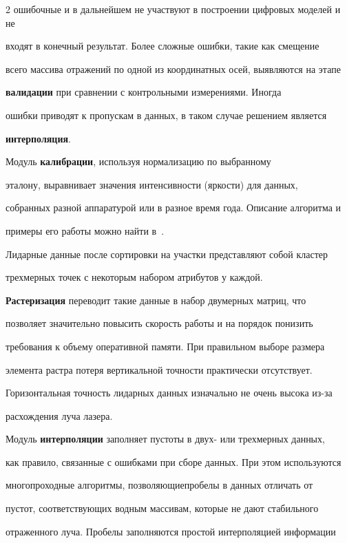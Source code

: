 \begin{multicols}{2}
ошибочные и в дальнейшем не участвуют в построении цифровых моделей и не 

входят в конечный результат. Более сложные ошибки, такие как смещение 

всего массива отражений по одной из координатных осей, выявляются на этапе 

\textbf{валидации} при сравнении с контрольными измерениями. Иногда 

ошибки приводят к пропускам в данных, в таком случае решением является 

\textbf{интерполяция}.

   

   Модуль \textbf{калибрации}, используя нормализацию по выбранному 

эталону, выравнивает значения интенсивности (яркости) для данных, 

собранных разной аппаратурой или в разное время года. Описание алгоритма и 

примеры его работы можно найти в~\cite{5su}.

   

   Лидарные данные после сортировки на участки представляют собой кластер 

трехмерных точек с некоторым набором атрибутов у каждой. 

\textbf{Растеризация} переводит такие данные в набор двумерных матриц, что 

позволяет значительно повысить скорость работы и на порядок понизить 

требования к объему оперативной памяти. При правильном выборе размера 

элемента растра потеря вертикальной точности практически отсутствует. 

Горизонтальная точность лидарных данных изначально не очень высока из-за 

расхождения луча лазера.

   

   Модуль \textbf{интерполяции} заполняет пустоты в двух- или трехмерных данных, 

как правило, связанные с ошибками при сборе данных. При этом используются 

многопроходные алгоритмы, позволяющие\linebreak пробелы в данных отличать от 

пустот, со\-от\-вет\-ст\-ву\-ющих водным массивам, которые не дают стабильного 

отраженного луча. Пробелы заполняются прос\-той интерполяцией информации 


\end{multicols}

